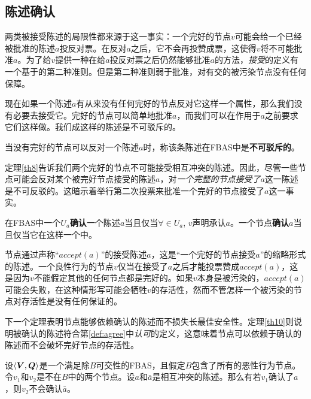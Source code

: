 \subsection{陈述确认}

两类被接受陈述的局限性都来源于这一事实：一个完好的节点$v$可能会给一个已经被批准的陈述$a$投反对票。在反对$a$之后，它不会再投赞成票，这使得$v$将不可能批准$a$。为了给$v$提供一种在给$a$投反对票之后仍然能够批准$a$的方法，\textit{接受}的定义有一个基于{\vblock}的第二种准则。但是第二种准则弱于批准，对有{\quorum}交的被污染节点没有任何保障。

现在如果一个陈述$a$有从来没有任何完好的节点反对它这样一个属性，那么我们没有必要去接受它。完好的节点可以简单地批准$a$，而我们可以在作用于$a$之前要求它们这样做。我们成这样的陈述是不可驳斥的。

\begin{definition}[不可驳斥]
	当没有完好的节点可以反对一个陈述$a$时，称该条陈述在FBAS中是\textbf{不可驳斥的}。
\end{definition}

定理\ref{th8}告诉我们两个完好的节点不可能接受相互冲突的陈述。因此，尽管一些节点可能会反对某个被完好节点接受的陈述$a$，对\textit{一个完整的节点接受了$a$}这一陈述是不可反驳的。这暗示着举行第二次投票来批准一个完好的节点接受了$a$这一事实。

\begin{definition}[确认]
	在FBAS中一个{\quorum}$U_a$\textbf{确认}一个陈述$a$当且仅当$\forall \in U_a$, $v$声明承认$a$。一个节点\textbf{确认}$a$当且仅当它在这样一个{\quorum}中。
\end{definition}

节点通过声称``$accept(a)$''的接受陈述$a$，这是``一个完好的节点接受$a$''的缩略形式的陈述。一个良性行为的节点$v$仅当在接受了$a$之后才能投票赞成$accept(a)$，这是因为$v$不能假定其他的任何节点都是完好的。如果$v$本身是被污染的，$accept(a)$可能会失败，在这种情形写可能会牺牲$v$的存活性，然而不管怎样一个被污染的节点对存活性是没有任何保证的。

下一个定理表明节点能够依赖确认的陈述而不损失长最佳安全性。定理\ref{th10}则说明被确认的陈述符合第\ref{def:agree}中\textit{认可}的定义，这意味着节点可以依赖于确认的陈述而不会破坏完好节点的存活性。

\begin{theorem}\label{th9}
	设$\langle{\bm V},{\bm Q}\rangle$是一个满足除$B${\quorum}可交性的FBAS，且假定$B$包含了所有的恶性行为节点。令$v_1$和$v_2$是不在$B$中的两个节点。设$a$和$\bar a$是相互冲突的陈述。那么有若$v_1$确认了$a$，则$v_2$不会确认$\bar a$。
\end{theorem}

